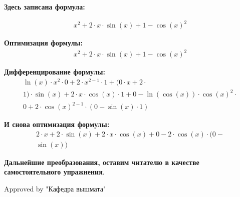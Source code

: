 \documentclass[12pt, a4paper]{article}\usepackage[utf8]{inputenc}
\begin{document}
\textbf{Здесь записана формула:}

\begin{equation}
\begin{split}
x ^ 2 + 2 \cdot x \cdot \sin(x) + 1 - \cos(x) ^ 2
\end{split}
\end{equation}

\textbf{Оптимизация формулы:}
\begin{equation}
\begin{split}x ^ 2 + 2 \cdot x \cdot \sin(x) + 1 - \cos(x) ^ 2
\end{split}
\end{equation}

\textbf{Дифференцирование формулы:}
\begin{equation}
\begin{split}\ln(x) \cdot x ^ 2 \cdot 0 + 2 \cdot x ^ {2 - 1} \cdot 1 + (0 \cdot x + 2 \cdot  \\
1) \cdot \sin(x) + 2 \cdot x \cdot \cos(x) \cdot 1 + 0 - \ln(\cos(x)) \cdot \cos(x) ^ 2 \cdot  \\
0 + 2 \cdot \cos(x) ^ {2 - 1}\cdot (0 - \sin(x) \cdot 1)
\end{split}
\end{equation}

\textbf{И снова оптимизация формулы:}
\begin{equation}
\begin{split}
2 \cdot x + 2 \cdot \sin(x) + 2 \cdot x \cdot \cos(x) + 0 - 2 \cdot \cos(x)\cdot (0 -  \\
\sin(x))
\end{split}
\end{equation}

\textbf{Дальнейшие преобразования, оставим читателю в качестве самостоятельного упражнения}.

Approved by "Кафедра вышмата"
\end{document}
